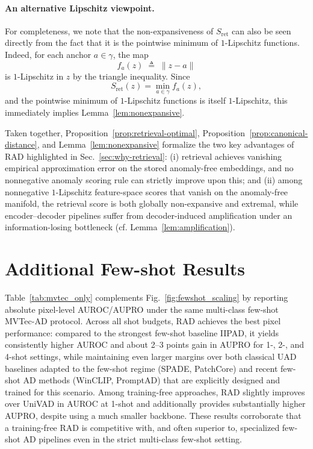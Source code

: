\documentclass{article}
\theoremstyle{plain}
\theoremstyle{definition}
\theoremstyle{remark}
\begin{document}
\paragraph{An alternative Lipschitz viewpoint.}
For completeness, we note that the non-expansiveness of
$S_{\mathrm{ret}}$ can also be seen directly from the fact that it is
the pointwise minimum of $1$-Lipschitz functions. Indeed, for each anchor
$a\in\gamma$, the map
\begin{equation}
    f_a(z) \;\triangleq\; \|z-a\|
\end{equation}
is $1$-Lipschitz in $z$ by the triangle inequality. Since
\begin{equation}
    S_{\mathrm{ret}}(z)
    = \min_{a\in\gamma} f_a(z),
\end{equation}
and the pointwise minimum of $1$-Lipschitz functions is itself
$1$-Lipschitz, this immediately implies Lemma~\ref{lem:nonexpansive}.

\medskip

Taken together, Proposition~\ref{prop:retrieval-optimal},
Proposition~\ref{prop:canonical-distance}, and
Lemma~\ref{lem:nonexpansive} formalize the two key advantages of RAD
highlighted in Sec.~\ref{sec:why-retrieval}: (i) retrieval achieves
vanishing empirical approximation error on the stored anomaly-free
embeddings, and no nonnegative anomaly scoring rule can strictly improve
upon this; and (ii) among nonnegative $1$-Lipschitz feature-space
scores that vanish on the anomaly-free manifold, the retrieval score is
both globally non-expansive and extremal, while encoder--decoder
pipelines suffer from decoder-induced amplification under an
information-losing bottleneck (cf. Lemma~\ref{lem:amplification}).



\section{Additional Few-shot Results}
\label{sec:few-shot}



Table~\ref{tab:mvtec_only} complements Fig.~\ref{fig:fewshot_scaling} by reporting absolute pixel-level AUROC/AUPRO under the same multi-class few-shot MVTec-AD protocol. Across all shot budgets, RAD achieves the best pixel performance: compared to the strongest few-shot baseline IIPAD, it yields consistently higher AUROC and about 2--3 points gain in AUPRO for 1-, 2-, and 4-shot settings, while maintaining even larger margins over both classical UAD baselines adapted to the few-shot regime (SPADE, PatchCore) and recent few-shot AD methods (WinCLIP, PromptAD) that are explicitly designed and trained for this scenario. Among training-free approaches, RAD slightly improves over UniVAD in AUROC at 1-shot and additionally provides substantially higher AUPRO, despite using a much smaller backbone. These results corroborate that a training-free RAD is competitive with, and often superior to, specialized few-shot AD pipelines even in the strict multi-class few-shot setting.
\end{document}
